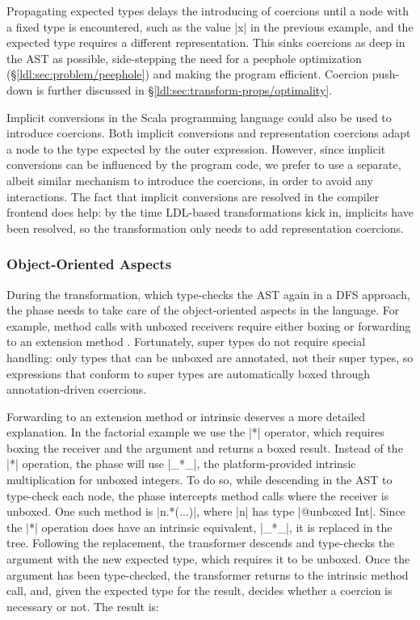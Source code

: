 Propagating expected types delays the introducing of coercions until a node with a fixed type is encountered, such as the value |x| in the previous example, and the expected type requires a different representation. This sinks coercions as deep in the AST as possible, side-stepping the need for a peephole optimization (\S\ref{ldl:sec:problem/peephole}) and making the program efficient. Coercion push-down is further discussed in \S\ref{ldl:sec:transform-props/optimality}.

Implicit conversions in the Scala programming language could also be used to introduce coercions. Both implicit conversions and representation coercions adapt a node to the type expected by the outer expression. However, since implicit conversions can be influenced by the program code, we prefer to use a separate, albeit similar mechanism to introduce the coercions, in order to avoid any interactions. The fact that implicit conversions are resolved in the compiler frontend does help: by the time LDL-based transformations kick in, implicits have been resolved, so the transformation only needs to add representation coercions.

\subsubsection*{Object-Oriented Aspects}
\label{ldl:subsec:coerce-object-oriented}

During the transformation, which type-checks the AST again in a DFS approach, the \coerce{} phase needs to take care of the object-oriented aspects in the language. For example, method calls with unboxed receivers require either boxing or forwarding to an extension method \cite{sip-value-classes}. Fortunately, super types do not require special handling: only types that can be unboxed are annotated, not their super types, so expressions that conform to super types are automatically boxed through annotation-driven coercions.

Forwarding to an extension method or intrinsic deserves a more detailed explanation. In the factorial example we use the |*| operator, which requires boxing the receiver and the argument and returns a boxed result. Instead of the |*| operation, the \coerce{} phase will use |_*_|, the platform-provided intrinsic multiplication for unboxed integers. To do so, while descending in the AST to type-check each node, the \coerce{} phase intercepts method calls where the receiver is unboxed. One such method is |n.*(...)|, where |n| has type |@unboxed Int|. Since the |*| operation does have an intrinsic equivalent, |_*_|, it is replaced in the tree. Following the replacement, the \coerce{} transformer descends and type-checks the argument with the new expected type, which requires it to be unboxed. Once the argument has been type-checked, the \coerce{} transformer returns to the intrinsic method call, and, given the expected type for the result, decides whether a coercion is necessary or not. The result is:

